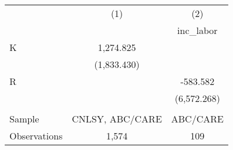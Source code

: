 \begin{tabular}{lcc} \toprule
 & (1) & (2) \\
&  & inc\_labor \\ \midrule
K & 1,274.825 &  \\
 & (1,833.430) &  \\
R &  & -583.582 \\
 &  & (6,572.268) \\ \\ \midrule
Sample          & CNLSY, ABC/CARE & ABC/CARE \\ 
Observations & 1,574 & 109 \\ \bottomrule
\end{tabular}
